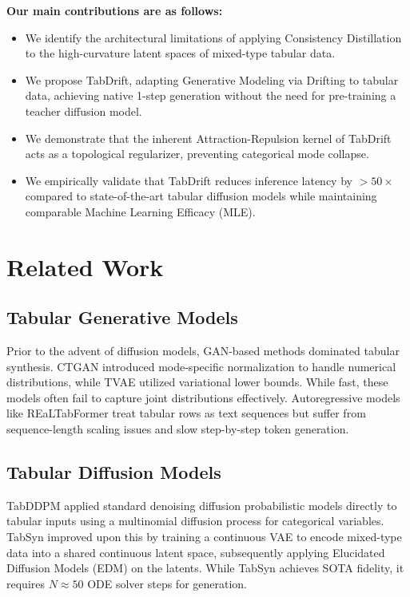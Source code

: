 \documentclass[10pt,journal,compsoc]{IEEEtran}
\begin{document}
\textbf{Our main contributions are as follows:}
\begin{itemize}
    \item We identify the architectural limitations of applying Consistency Distillation to the high-curvature latent spaces of mixed-type tabular data.
    \item We propose TabDrift, adapting Generative Modeling via Drifting to tabular data, achieving native 1-step generation without the need for pre-training a teacher diffusion model.
    \item We demonstrate that the inherent Attraction-Repulsion kernel of TabDrift acts as a topological regularizer, preventing categorical mode collapse.
    \item We empirically validate that TabDrift reduces inference latency by $>50\times$ compared to state-of-the-art tabular diffusion models while maintaining comparable Machine Learning Efficacy (MLE).
\end{itemize}

\section{Related Work}
\subsection{Tabular Generative Models}
Prior to the advent of diffusion models, GAN-based methods dominated tabular synthesis. CTGAN introduced mode-specific normalization to handle numerical distributions, while TVAE utilized variational lower bounds. While fast, these models often fail to capture joint distributions effectively. Autoregressive models like REaLTabFormer treat tabular rows as text sequences but suffer from sequence-length scaling issues and slow step-by-step token generation. 

\subsection{Tabular Diffusion Models}
TabDDPM applied standard denoising diffusion probabilistic models directly to tabular inputs using a multinomial diffusion process for categorical variables. TabSyn improved upon this by training a continuous VAE to encode mixed-type data into a shared continuous latent space, subsequently applying Elucidated Diffusion Models (EDM) on the latents. While TabSyn achieves SOTA fidelity, it requires $N \approx 50$ ODE solver steps for generation.
\end{document}
